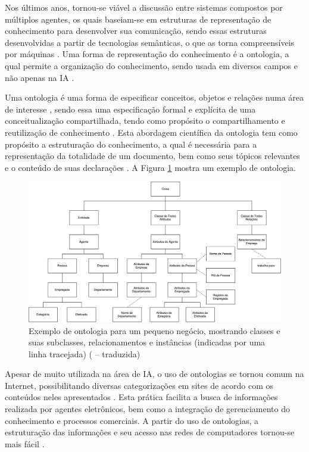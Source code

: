 Nos últimos anos, tornou-se viável a discussão entre sistemas compostos por múltiplos agentes, os quais baseiam-se em estruturas de representação de conhecimento para desenvolver sua comunicação, sendo essas estruturas desenvolvidas a partir de tecnologias semânticas, o que as torna compreensíveis por máquinas \cite{godert2014}. Uma forma de representação do conhecimento é a ontologia, a qual permite a organização do conhecimento, sendo usada em diversos campos e não apenas na IA \cite{ONTOLOGIAI}.

Uma  ontologia  é  uma  forma  de  especificar  conceitos,  objetos  e  relações  numa área de interesse \cite{WEISS1999}, sendo essa uma especificação formal e explícita de uma conceitualização compartilhada, tendo como propósito o compartilhamento e reutilização de conhecimento \cite{UFG2007}.  Esta abordagem científica da ontologia tem como propósito a estruturação do conhecimento, a qual é necessária para a representação da totalidade de um documento, bem como seus tópicos relevantes e o conteúdo de suas declarações \cite{godert2014}. A Figura \ref{fig:ontologia} mostra um exemplo de ontologia.

\begin{figure}[H]
    \centering
    \caption[Exemplo de Ontologia]{\label{fig:ontologia}Exemplo de ontologia para um pequeno negócio, mostrando classes e suas subclasses, relacionamentos e instâncias (indicadas por uma linha tracejada) (\cite{WEISS1999} -- traduzida)}
    \includegraphics[width=1\textwidth]{pdf/ontology-weiss.pdf}
\end{figure}

Apesar de muito utilizada na área de IA, o uso de ontologias se tornou comum na Internet, possibilitando diversas categorizações em sites de acordo com os conteúdos neles apresentados \cite{NOY2001}. Esta prática facilita a busca de informações realizada por agentes eletrônicos, bem como a integração de gerenciamento do conhecimento e processos comerciais. A partir do uso de ontologias, a estruturação das informações e seu acesso nas redes de computadores tornou-se mais fácil \cite{MAEDCHE2002}.

